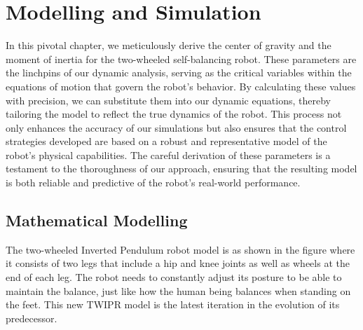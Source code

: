 \chapter{Modelling and Simulation}

\graphicspath{{./Figures/Modelling and Simulation}}

In this pivotal chapter, we meticulously derive the center of gravity and the moment of inertia for the two-wheeled self-balancing robot.
These parameters are the linchpins of our dynamic analysis, serving as the critical variables within the equations of motion that govern the robot's behavior.
By calculating these values with precision, we can substitute them into our dynamic equations, thereby tailoring the model to reflect the true dynamics of the robot.
This process not only enhances the accuracy of our simulations but also ensures that the control strategies developed are based on a robust and representative model of the robot's physical capabilities.
The careful derivation of these parameters is a testament to the thoroughness of our approach, ensuring that the resulting model is both reliable and predictive of the robot's real-world performance.
\newpage

\section{Mathematical Modelling}

The two-wheeled Inverted Pendulum robot model is as shown in the figure where it consists of two legs that include a hip and knee joints as well as wheels at the end of each leg.
The robot needs to constantly adjust its posture to be able to maintain the balance, just like how the human being balances when standing on the feet.
This new TWIPR model is the latest iteration in the evolution of its predecessor.


